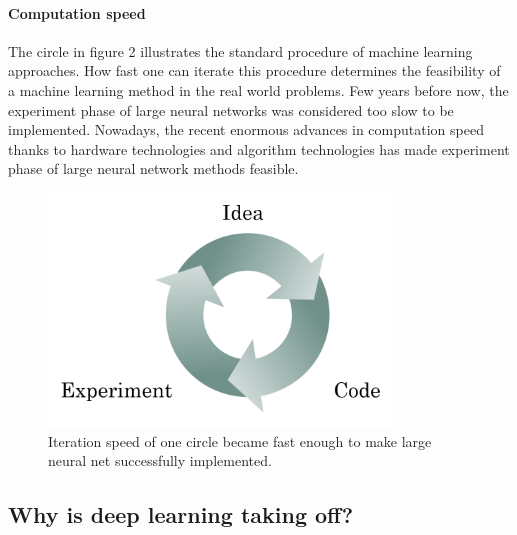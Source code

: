 \paragraph{Computation speed} The circle in figure 2 illustrates the standard procedure of machine learning approaches. How fast one can iterate this procedure determines the feasibility of a machine learning method in the real world problems. Few years before now, the experiment phase of large neural networks was considered too slow to be implemented. Nowadays, the recent enormous advances in computation speed thanks to hardware technologies and algorithm technologies has made experiment phase of large neural network methods feasible.
\begin{figure}[H]
\centering
\includegraphics[height=6.2cm]{c1w1_pic2.png}
\caption{Iteration speed of one circle became fast enough to make large neural net successfully implemented.}
\end{figure}


\subsection{Why is deep learning taking off?}